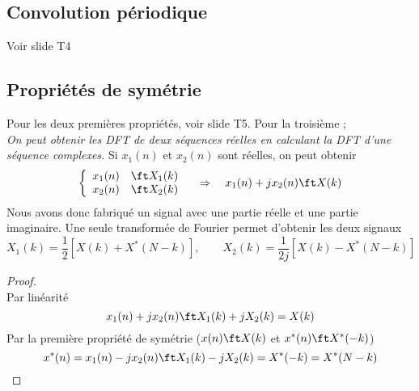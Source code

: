 	\subsection{Convolution périodique}
	Voir slide T4
	
	\subsection{Propriétés de symétrie}
	Pour les deux premières propriétés, voir slide T5. Pour la troisième ;\\
	\textit{On peut obtenir les DFT de deux séquences réelles en calculant la DFT d'une séquence 
	complexes.} Si $x_1(n)$ et $x_2(n)$ sont réelles, on peut obtenir
	\begin{equation}
	\left\{\begin{array}{ll}
	x_1(n) &\ft X_1(k)\\
	x_2(n) &\ft X_2(k)	
	\end{array}\right.\quad\Rightarrow\quad x_1(n)+jx_2(n) \ft X(k)
	\end{equation}
	Nous avons donc fabriqué un signal avec une partie réelle et une partie imaginaire. Une seule 
	transformée de Fourier permet d'obtenir les deux signaux
	\begin{equation}
	X_1(k) = \frac{1}{2}[X(k)+X^*(N-k)],\qquad 	X_2(k) = \frac{1}{2j}[X(k)-X^*(N-k)]	
	\end{equation}
	
	\begin{proof}\ \\
	Par linéarité
	\begin{equation}
	x_1(n)+jx_2(n) \ft X_1(k)+jX_2(k) = X(k)
	\end{equation}
	Par la première propriété de symétrie ($x(n)\ft X(k)$ et $x^*(n)\ft X^*(-k)$)
	\begin{equation}
	x^*(n) = x_1(n) -jx_2(n) \ft X_1(k)-jX_2(k) = X^*(-k)=X^*(N-k)
	\end{equation}
	\end{proof}
	

